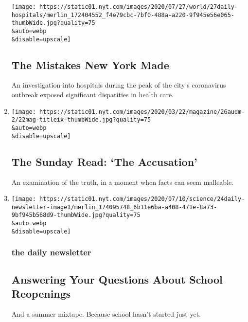 \begin{enumerate}
  \texttt{[image: https://static01.nyt.com/images/2020/07/27/world/27daily-hospitals/merlin\_172404552\_f4e79cbc-7bf0-488a-a220-9f945e56e065-thumbWide.jpg?quality=75\\\&auto=webp\\\&disable=upscale]}

  \hypertarget{the-mistakes-new-york-made}{%
  \subsection{The Mistakes New York
  Made}\label{the-mistakes-new-york-made}}

  An investigation into hospitals during the peak of the city's
  coronavirus outbreak exposed significant disparities in health care.
\item
  \href{/2020/07/26/podcasts/the-daily/the-accusation-the-sunday-read.html}{}

  \texttt{[image: https://static01.nyt.com/images/2020/03/22/magazine/26audm-2/22mag-titleix-thumbWide.jpg?quality=75\\\&auto=webp\\\&disable=upscale]}

  \hypertarget{the-sunday-read-the-accusation}{%
  \subsection{The Sunday Read: `The
  Accusation'}\label{the-sunday-read-the-accusation}}

  An examination of the truth, in a moment when facts can seem
  malleable.
\item
  \href{/2020/07/24/podcasts/daily-newsletter-schools-reopening-summer-playlist.html}{}

  \texttt{[image: https://static01.nyt.com/images/2020/07/10/science/24daily-newsletter-image1/merlin\_174095748\_6b11e6ba-a408-471e-8a73-9bf945b568d9-thumbWide.jpg?quality=75\\\&auto=webp\\\&disable=upscale]}

  \hypertarget{the-daily-newsletter-1}{%
  \subsubsection{the daily newsletter}\label{the-daily-newsletter-1}}

  \hypertarget{answering-your-questions-about-school-reopenings}{%
  \subsection{Answering Your Questions About School
  Reopenings}\label{answering-your-questions-about-school-reopenings}}

  And a summer mixtape. Because school hasn't started just yet.


\end{enumerate}
